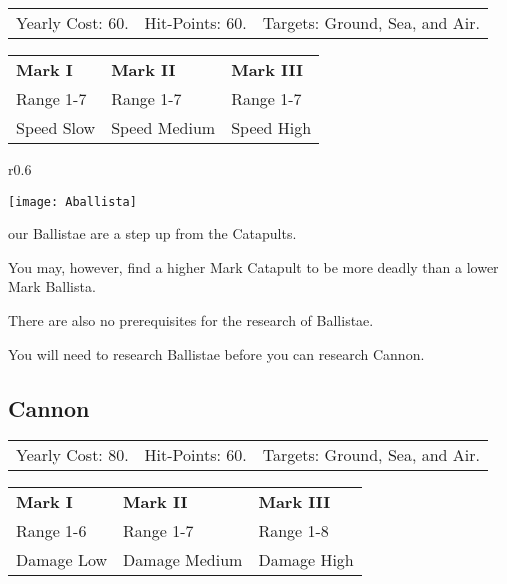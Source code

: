 
\begin{tabular}{p{1.264in} p{1.264in} p{1.264in}}
    Yearly Cost: 60. & Hit-Points: 60. & Targets: Ground, Sea, and Air.
\end{tabular}

\begin{tabular}{|p{1.264in} p{1.264in} p{1.264in}|}
    \hline
    \textbf{Mark I}    & \textbf{Mark II} & \textbf{Mark III} \\ 
    Range 1-7 & Range 1-7& Range 1-7 \\ 
    Speed Slow & Speed Medium & Speed High \\ 
    \hline
\end{tabular}

\begin{wrapfigure}{r}{0.6\textwidth}
    \vspace{-20pt}
    \begin{center}
        \texttt{[image: Aballista]} %
    \end{center}
    \vspace{-20pt}
\end{wrapfigure}

our Ballistae are a step up from the Catapults.

You may, however, find a higher Mark Catapult to be more deadly than a lower Mark Ballista.

There are also no prerequisites for the research of Ballistae.

You will need to research Ballistae before you can research Cannon.

\clearpage  %

\subsection{\textsf{Cannon}}



\begin{tabular}{p{1.264in} p{1.264in} p{1.264in}}
    Yearly Cost: 80. & Hit-Points: 60. & Targets: Ground, Sea, and Air.
\end{tabular}

\begin{tabular}{| p{1.264in} p{1.264in} p{1.264in}|}
    \hline
    \textbf{Mark I}    & \textbf{Mark II} & \textbf{Mark III} \\ 
    Range 1-6 & Range 1-7 & Range 1-8 \\ 
    Damage Low & Damage Medium & Damage High \\ 
    \hline
\end{tabular}
   
